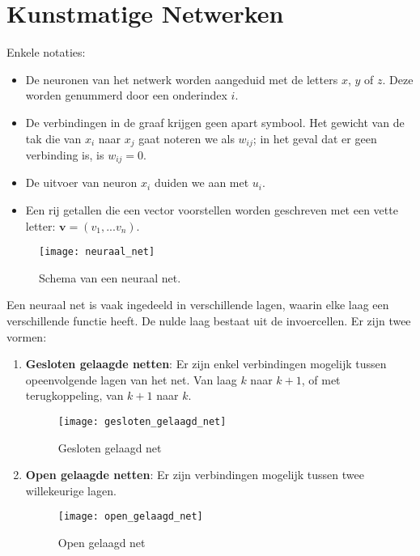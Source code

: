 \chapter{Kunstmatige Netwerken}
Enkele notaties:
\begin{itemize}
    \item De neuronen van het netwerk worden aangeduid met de letters $x$, $y$ of $z$. Deze worden genummerd door een onderindex $i$.
    \item De verbindingen in de graaf krijgen geen apart symbool. Het gewicht van de tak die van $x_i$ naar $x_j$ gaat noteren we als $w_{ij}$; in het geval dat er geen verbinding is, is $w_{ij} = 0$.
    \item De uitvoer van neuron $x_i$ duiden we aan met $u_{i}$.
    \item Een rij getallen die een vector voorstellen worden geschreven met een vette letter: $\textbf{v} = (v_1, ... v_n)$. 
\end{itemize}
\begin{figure}[ht]
    \centering
    \texttt{[image: neuraal\_net]}
    \caption{Schema van een neuraal net.}
    \label{}
\end{figure}

Een neuraal net is vaak ingedeeld in verschillende lagen, waarin elke laag een verschillende functie heeft. De nulde laag bestaat uit de invoercellen. Er zijn twee vormen:
\begin{enumerate}
    \item \textbf{Gesloten gelaagde netten}: Er zijn enkel verbindingen mogelijk tussen opeenvolgende lagen van het net. Van laag $k$ naar $k + 1$, of met terugkoppeling, van $k + 1$ naar $k$.
    \begin{figure}[ht]
        \centering
        \texttt{[image: gesloten\_gelaagd\_net]}
        \caption{Gesloten gelaagd net}
        \label{}
    \end{figure}
    \item \textbf{Open gelaagde netten}: Er zijn verbindingen mogelijk tussen twee willekeurige lagen.
    \begin{figure}[ht]
        \centering
        \texttt{[image: open\_gelaagd\_net]}
        \caption{Open gelaagd net}
        \label{}
    \end{figure}
\end{enumerate}

